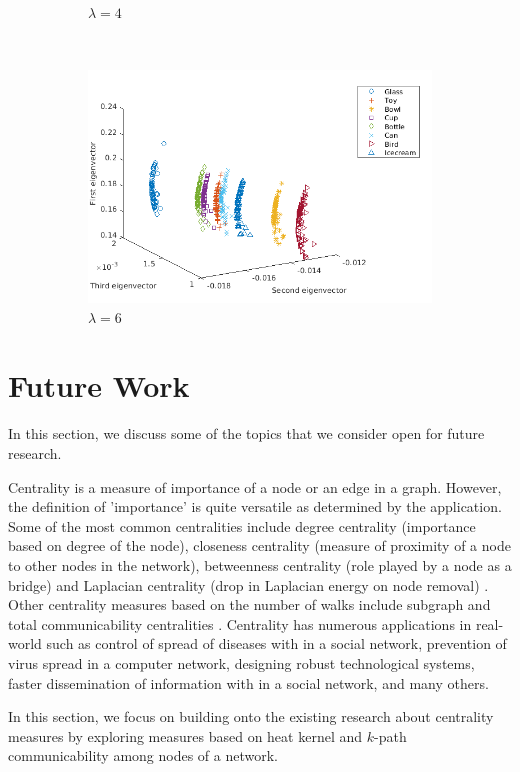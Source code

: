 \documentclass[10pt,a4paper]{article}
\theoremstyle{plain}
\theoremstyle{definition}
\begin{document}
\begin{figure}[H]
\begin{subfigure}[b]{0.5\textwidth}
		\caption{$\lambda=4$}
		\label{}
	\end{subfigure}~
	\begin{subfigure}[b]{0.5\textwidth}
		\includegraphics[width= \textwidth]{images/Zeta-Laplace6.png}
		\caption{$\lambda=6$}
		\label{}
	\end{subfigure}
	\caption{ }
	\label{}
\end{figure}

\newpage
\section{Future Work}
In this section, we discuss some of the topics that we consider open for future research. 

Centrality is a measure of importance of a node or an edge in a graph. However, the definition of 'importance' is quite versatile as determined by the application. Some of the most common centralities include degree centrality (importance based on degree of the node), closeness centrality (measure of proximity of a node to other nodes in the network), betweenness centrality (role played by a node as a bridge) and Laplacian centrality (drop in Laplacian energy on node removal) \citep{qi2012laplacian}. Other centrality measures based on the number of walks include subgraph and total communicability centralities \citep{estrada2005subgraph}.  
Centrality has numerous applications in real-world such as control of spread of diseases with in a social network, prevention of virus spread in a computer network, designing robust technological systems, faster dissemination of  information with in a social network, and many others. 

In this section, we focus on building onto the existing research about centrality measures by exploring measures based on heat kernel and $k$-path communicability among nodes of a network.
\end{document}
